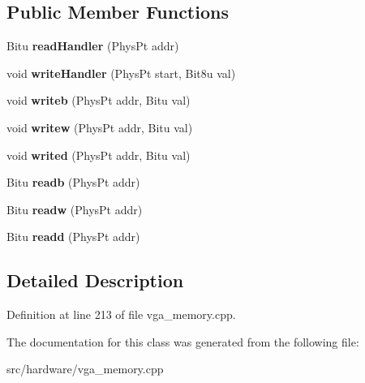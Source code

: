 \subsection*{Public Member Functions}
\begin{DoxyCompactItemize}
\item 
\hypertarget{classVGA__ChainedEGA__Handler_ad30e9d55ed10bcdd37a79f782eb72831}{Bitu {\bfseries read\-Handler} (Phys\-Pt addr)}\label{classVGA__ChainedEGA__Handler_ad30e9d55ed10bcdd37a79f782eb72831}

\item 
\hypertarget{classVGA__ChainedEGA__Handler_ac2b7a4387eedaaa0aca4c63f47a43fe0}{void {\bfseries write\-Handler} (Phys\-Pt start, Bit8u val)}\label{classVGA__ChainedEGA__Handler_ac2b7a4387eedaaa0aca4c63f47a43fe0}

\item 
\hypertarget{classVGA__ChainedEGA__Handler_a3f8f9adedc40168b0722941dcf943a14}{void {\bfseries writeb} (Phys\-Pt addr, Bitu val)}\label{classVGA__ChainedEGA__Handler_a3f8f9adedc40168b0722941dcf943a14}

\item 
\hypertarget{classVGA__ChainedEGA__Handler_af375be647ece27ad32c00ad06da8dc67}{void {\bfseries writew} (Phys\-Pt addr, Bitu val)}\label{classVGA__ChainedEGA__Handler_af375be647ece27ad32c00ad06da8dc67}

\item 
\hypertarget{classVGA__ChainedEGA__Handler_a786cd2a04f33dbf959ace4360cf0a779}{void {\bfseries writed} (Phys\-Pt addr, Bitu val)}\label{classVGA__ChainedEGA__Handler_a786cd2a04f33dbf959ace4360cf0a779}

\item 
\hypertarget{classVGA__ChainedEGA__Handler_a4dfa545a14646d1058ef44405c5f6550}{Bitu {\bfseries readb} (Phys\-Pt addr)}\label{classVGA__ChainedEGA__Handler_a4dfa545a14646d1058ef44405c5f6550}

\item 
\hypertarget{classVGA__ChainedEGA__Handler_a4a215d3013f495ee364797498aacab56}{Bitu {\bfseries readw} (Phys\-Pt addr)}\label{classVGA__ChainedEGA__Handler_a4a215d3013f495ee364797498aacab56}

\item 
\hypertarget{classVGA__ChainedEGA__Handler_ab64ac70439070c7e1fb83d4aee1f05bb}{Bitu {\bfseries readd} (Phys\-Pt addr)}\label{classVGA__ChainedEGA__Handler_ab64ac70439070c7e1fb83d4aee1f05bb}

\end{DoxyCompactItemize}


\subsection{Detailed Description}


Definition at line 213 of file vga\-\_\-memory.\-cpp.



The documentation for this class was generated from the following file\-:\begin{DoxyCompactItemize}
\item 
src/hardware/vga\-\_\-memory.\-cpp\end{DoxyCompactItemize}
